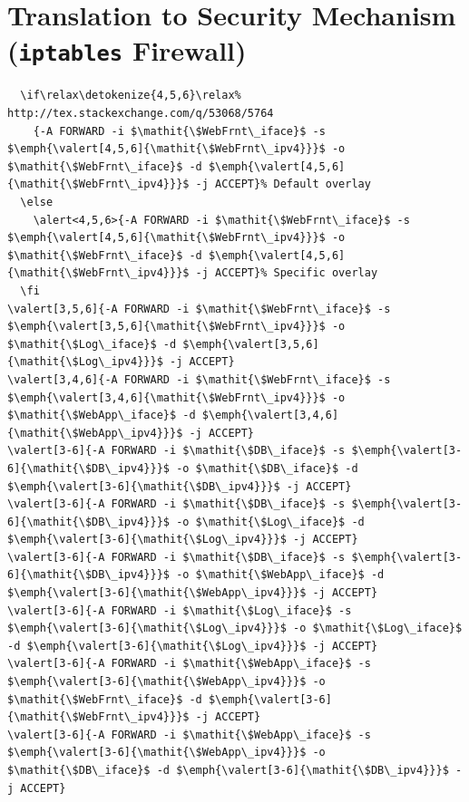 \newcommand{\valert}[2][]{%
  \if\relax\detokenize{#1}\relax%
    {#2}%
  \else
    \alert<#1>{#2}%
  \fi}


\section{Translation to Security Mechanism (\texttt{iptables} Firewall)}
\begin{frame}[fragile]
	\begin{center}
	\begin{footnotesize}
	\begin{Verbatim}[commandchars=\\\{\},codes={\catcode`$=3\catcode`^=7}]
\valert[4,5,6]{-A FORWARD -i $\mathit{\$WebFrnt\_iface}$ -s $\emph{\valert[4,5,6]{\mathit{\$WebFrnt\_ipv4}}}$ -o $\mathit{\$WebFrnt\_iface}$ -d $\emph{\valert[4,5,6]{\mathit{\$WebFrnt\_ipv4}}}$ -j ACCEPT}
\valert[3,5,6]{-A FORWARD -i $\mathit{\$WebFrnt\_iface}$ -s $\emph{\valert[3,5,6]{\mathit{\$WebFrnt\_ipv4}}}$ -o $\mathit{\$Log\_iface}$ -d $\emph{\valert[3,5,6]{\mathit{\$Log\_ipv4}}}$ -j ACCEPT}
\valert[3,4,6]{-A FORWARD -i $\mathit{\$WebFrnt\_iface}$ -s $\emph{\valert[3,4,6]{\mathit{\$WebFrnt\_ipv4}}}$ -o $\mathit{\$WebApp\_iface}$ -d $\emph{\valert[3,4,6]{\mathit{\$WebApp\_ipv4}}}$ -j ACCEPT}
\valert[3-6]{-A FORWARD -i $\mathit{\$DB\_iface}$ -s $\emph{\valert[3-6]{\mathit{\$DB\_ipv4}}}$ -o $\mathit{\$DB\_iface}$ -d $\emph{\valert[3-6]{\mathit{\$DB\_ipv4}}}$ -j ACCEPT}
\valert[3-6]{-A FORWARD -i $\mathit{\$DB\_iface}$ -s $\emph{\valert[3-6]{\mathit{\$DB\_ipv4}}}$ -o $\mathit{\$Log\_iface}$ -d $\emph{\valert[3-6]{\mathit{\$Log\_ipv4}}}$ -j ACCEPT}
\valert[3-6]{-A FORWARD -i $\mathit{\$DB\_iface}$ -s $\emph{\valert[3-6]{\mathit{\$DB\_ipv4}}}$ -o $\mathit{\$WebApp\_iface}$ -d $\emph{\valert[3-6]{\mathit{\$WebApp\_ipv4}}}$ -j ACCEPT}
\valert[3-6]{-A FORWARD -i $\mathit{\$Log\_iface}$ -s $\emph{\valert[3-6]{\mathit{\$Log\_ipv4}}}$ -o $\mathit{\$Log\_iface}$ -d $\emph{\valert[3-6]{\mathit{\$Log\_ipv4}}}$ -j ACCEPT}
\valert[3-6]{-A FORWARD -i $\mathit{\$WebApp\_iface}$ -s $\emph{\valert[3-6]{\mathit{\$WebApp\_ipv4}}}$ -o $\mathit{\$WebFrnt\_iface}$ -d $\emph{\valert[3-6]{\mathit{\$WebFrnt\_ipv4}}}$ -j ACCEPT}
\valert[3-6]{-A FORWARD -i $\mathit{\$WebApp\_iface}$ -s $\emph{\valert[3-6]{\mathit{\$WebApp\_ipv4}}}$ -o $\mathit{\$DB\_iface}$ -d $\emph{\valert[3-6]{\mathit{\$DB\_ipv4}}}$ -j ACCEPT}

\end{Verbatim}
\end{footnotesize}
\end{center}
\end{frame}
